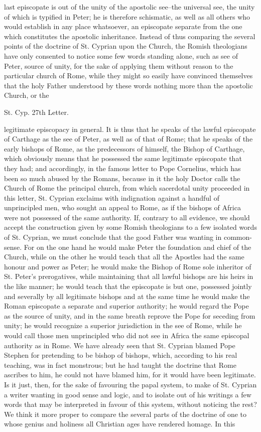 last episcopate is out of the unity of the apostolic see--the universal see, the unity of which is typified in Peter; he is therefore schismatic, as well as all others who would establish in any place whatsoever, an episcopate separate from the one which constitutes the apostolic inheritance. Instead of thus comparing the several points of the doctrine of St. Cyprian upon the Church, the Romish theologians have only consented to notice some few words standing alone, such as see of Peter, source of unity, for the sake of applying them without reason to the particular church of Rome, while they might so easily have convinced themselves that the holy Father understood by these words nothing more than the apostolic Church, or the

St. Cyp. 27th Letter.

legitimate episcopacy in general. It is thus that he speaks of the lawful episcopate of Carthage as the see of Peter, as well as of that of Rome; that he speaks of the early bishops of Rome, as the predecessors of himself, the Bishop of Carthage, which obviously means that he possessed the same legitimate episcopate that they had; and accordingly, in the famous letter to Pope Cornelius, which has been so much abused by the Romans, because in it the holy Doctor calls the Church of Rome the principal church, from which sacerdotal unity proceeded in this letter, St. Cyprian exclaims with indignation against a handful of unprincipled men, who sought an appeal to Rome, as if the bishops of Africa were not possessed of the same authority. If, contrary to all evidence, we should accept the construction given by some Romish theologians to a few isolated words of St. Cyprian, we must conclude that the good Father was wanting in common-sense. For on the one hand he would make Peter the foundation and chief of the Church, while on the other he would teach that all the Apostles had the same honour and power as Peter; he would make the Bishop of Rome sole inheritor of St. Peter's prerogatives, while maintaining that all lawful bishops are his heirs in the like manner; he would teach that the episcopate is but one, possessed jointly and severally by all legitimate bishops and at the same time he would make the Roman episcopate a separate and superior authority; he would regard the Pope as the source of unity, and in the same breath reprove the Pope for seceding from unity; he would recognize a superior jurisdiction in the see of Rome, while he would call those men unprincipled who did not see in Africa the same episcopal authority as in Rome. We have already seen that St. Cyprian blamed Pope Stephen for pretending to be bishop of bishops, which, according to his real teaching, was in fact monstrous; but he had taught the doctrine that Rome ascribes to him, he could not have blamed him, for it would have been legitimate. Is it just, then, for the sake of favouring the papal system, to make of St. Cyprian a writer wanting in good sense and logic, and to isolate out of his writings a few words that may be interpreted in favour of this system, without noticing the rest? We think it more proper to compare the several parts of the doctrine of one to whose genius and holiness all Christian ages have rendered homage. In this 